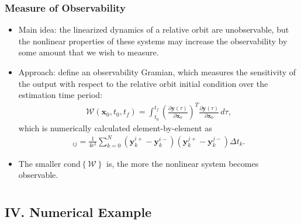 \documentclass[hyperref={pdftex,pdfpagemode=none,pdfstartview=FitH},10pt]{beamer}
\newcommand{\braces}[1]{\ensuremath{\left\{ #1 \right\}}}
\newcommand{\parenth}[1]{\ensuremath{\left( #1 \right)}}
\newcommand{\deriv}[2]{\ensuremath{\frac{\partial #1}{\partial #2}}}
\newcommand{\y}{\mathbf{y}}
\newcommand{\x}{\mathbf{x}}
\begin{document}
\begin{frame}
\frametitle{Measure of Observability}

\begin{itemize}
\item Main idea: the linearized dynamics of a relative orbit are unobservable, but the nonlinear properties of these systems may increase the observability by some amount that we wish to measure.
\item Approach: define an observability Gramian, which measures the sensitivity of the output with respect to the relative orbit initial condition over the estimation time period:
\begin{align}
\mathcal{W} (\x_0,t_0,t_f) = \int_{t_0}^{t_f} \parenth{\deriv{\y(\tau)}{\x_0}}^T\deriv{\y(\tau)}{\x_0}\,d\tau,\label{eqn:Wo_NL}
\end{align}
which is numerically calculated element-by-element as
\begin{align}
[\mathcal{W}]_{ij} = \frac{1}{4\epsilon^2}\sum_{k=0}^N (\y^{i+}_k-\y^{i-}_k)(\y^{j+}_k-\y^{j-}_k) \Delta t_k.
\end{align}
\item The smaller $\mathrm{cond}\braces{\mathcal{W}}$ is, the more the nonlinear system becomes observable.
\end{itemize}

\end{frame}


\section*{}
\subsection*{IV. Numerical Example}
\end{document}
